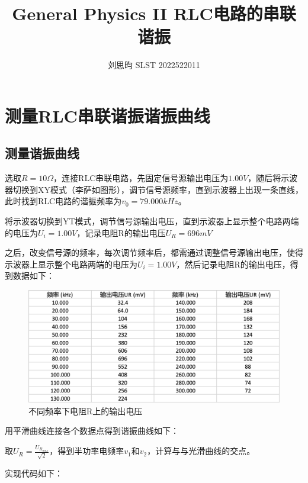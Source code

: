 \documentclass{article}
\author{刘思昀 SLST 2022522011}
\title{General Physics II RLC电路的串联谐振}
\begin{document}
\date{}

\maketitle

\section{测量RLC串联谐振谐振曲线}
\subsection{测量谐振曲线}
选取$R = 10 \Omega$，连接RLC串联电路，先固定信号源输出电压为$1.00V$，随后将示波器切换到XY模式（李萨如图形），调节信号源频率，直到示波器上出现一条直线，此时找到RLC电路的谐振频率为$v_0 = 79.000 kHz$。

将示波器切换到YT模式，调节信号源输出电压，直到示波器上显示整个电路两端的电压为$U_i = 1.00V$，记录电阻R的输出电压$U_R = 696 mV$

之后，改变信号源的频率，每次调节频率后，都需通过调整信号源输出电压，使得示波器上显示整个电路两端的电压为$U_i= 1.00V$，然后记录电阻R的输出电压，得到数据如下：
\begin{figure}[htbp]
    \centering
    \includegraphics[width=1.0\textwidth]{1-1.png}
    \caption{不同频率下电阻R上的输出电压}
\end{figure}

用平滑曲线连接各个数据点得到谐振曲线如下：

取$U_R = \frac{U_{R_{max}}}{\sqrt{2}}$，得到半功率电频率$v_1$和$v_2$，计算与与光滑曲线的交点。

实现代码如下：
\end{document}
